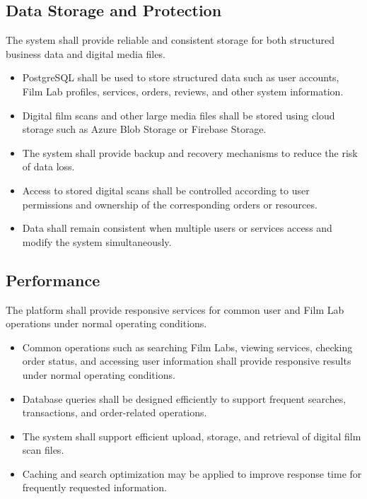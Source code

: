 \subsection{Data Storage and Protection}

The system shall provide reliable and consistent storage for both structured
business data and digital media files.

\begin{itemize}
    \item PostgreSQL shall be used to store structured data such as user
    accounts, Film Lab profiles, services, orders, reviews, and other
    system information.

    \item Digital film scans and other large media files shall be stored using
    cloud storage such as Azure Blob Storage or Firebase Storage.

    \item The system shall provide backup and recovery mechanisms to reduce
    the risk of data loss.

    \item Access to stored digital scans shall be controlled according to
    user permissions and ownership of the corresponding orders or resources.

    \item Data shall remain consistent when multiple users or services
    access and modify the system simultaneously.
\end{itemize}

\subsection{Performance}

The platform shall provide responsive services for common user and Film Lab
operations under normal operating conditions.

\begin{itemize}
    \item Common operations such as searching Film Labs, viewing services,
    checking order status, and accessing user information shall provide
    responsive results under normal operating conditions.

    \item Database queries shall be designed efficiently to support frequent
    searches, transactions, and order-related operations.

    \item The system shall support efficient upload, storage, and retrieval
    of digital film scan files.

    \item Caching and search optimization may be applied to improve response
    time for frequently requested information.
\end{itemize}

